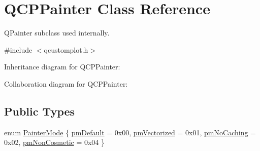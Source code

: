 \hypertarget{class_q_c_p_painter}{}\section{Q\+C\+P\+Painter Class Reference}
\label{class_q_c_p_painter}


Q\+Painter subclass used internally.  




{\ttfamily \#include $<$qcustomplot.\+h$>$}



Inheritance diagram for Q\+C\+P\+Painter\+:


Collaboration diagram for Q\+C\+P\+Painter\+:
\subsection*{Public Types}
\begin{DoxyCompactItemize}
\item 
enum \hyperlink{class_q_c_p_painter_a156cf16444ff5e0d81a73c615fdb156d}{Painter\+Mode} \{ \hyperlink{class_q_c_p_painter_a156cf16444ff5e0d81a73c615fdb156da3bac5e87e3d58553b297befb4eee2a45}{pm\+Default} = 0x00, 
\hyperlink{class_q_c_p_painter_a156cf16444ff5e0d81a73c615fdb156daeda679cd55dcd468341d07d48a30b6ab}{pm\+Vectorized} = 0x01, 
\hyperlink{class_q_c_p_painter_a156cf16444ff5e0d81a73c615fdb156dae78f9a4eb277a5f9207f50850a51a0b0}{pm\+No\+Caching} = 0x02, 
\hyperlink{class_q_c_p_painter_a156cf16444ff5e0d81a73c615fdb156dac1e481bfaf408f2bd2eaad3ec341f36b}{pm\+Non\+Cosmetic} = 0x04
 \}
\end{DoxyCompactItemize}
